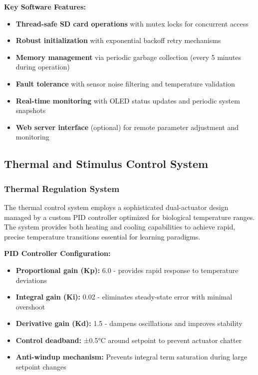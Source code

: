 \documentclass[11pt,a4paper]{article}
\begin{document}
\textbf{Key Software Features:}
\begin{itemize}
\item \textbf{Thread-safe SD card operations} with mutex locks for concurrent access
\item \textbf{Robust initialization} with exponential backoff retry mechanisms
\item \textbf{Memory management} via periodic garbage collection (every 5 minutes during operation)
\item \textbf{Fault tolerance} with sensor noise filtering and temperature validation
\item \textbf{Real-time monitoring} with OLED status updates and periodic system snapshots
\item \textbf{Web server interface} (optional) for remote parameter adjustment and monitoring
\end{itemize}

\subsection{Thermal and Stimulus Control System}

\subsubsection{Thermal Regulation System}

The thermal control system employs a sophisticated dual-actuator design managed by a custom PID controller optimized for biological temperature ranges. The system provides both heating and cooling capabilities to achieve rapid, precise temperature transitions essential for learning paradigms.

\textbf{PID Controller Configuration:}
\begin{itemize}
\item \textbf{Proportional gain (Kp):} 6.0 - provides rapid response to temperature deviations
\item \textbf{Integral gain (Ki):} 0.02 - eliminates steady-state error with minimal overshoot
\item \textbf{Derivative gain (Kd):} 1.5 - dampens oscillations and improves stability
\item \textbf{Control deadband:} ±0.5°C around setpoint to prevent actuator chatter
\item \textbf{Anti-windup mechanism:} Prevents integral term saturation during large setpoint changes
\end{itemize}
\end{document}
